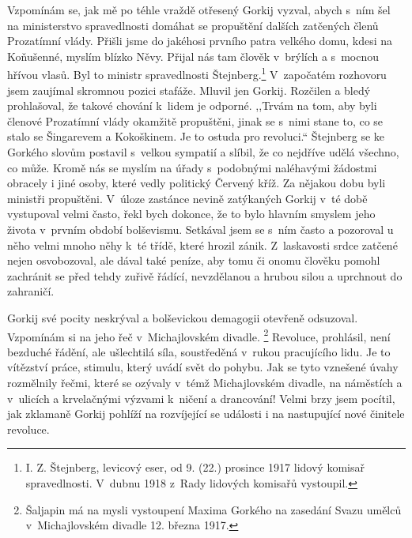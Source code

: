 Vzpomínám se, jak mě po téhle vraždě otřesený Gorkij vyzval, abych s ním šel na ministerstvo spravedlnosti domáhat se propuštění dalších zatčených členů Prozatímní vlády. Přišli jsme do jakéhosi prvního patra velkého domu, kdesi na Koňušenné, myslím blízko Něvy. Přijal nás tam člověk v brýlích a s mocnou hřívou vlasů. Byl to ministr spravedlnosti Štejnberg.\footnote{I. Z. Štejnberg, levicový eser, od 9. (22.) prosince 1917 lidový komisař spravedlnosti. V dubnu 1918 z Rady lidových komisařů vystoupil.} V započatém rozhovoru jsem zaujímal skromnou pozici stafáže. Mluvil jen Gorkij. Rozčilen a bledý prohlašoval, že takové chování k lidem je odporné. ,,Trvám na tom, aby byli členové Prozatímní vlády okamžitě propuštěni, jinak se s nimi stane to, co se stalo se Šingarevem a Kokoškinem. Je to ostuda pro revoluci.`` Štejnberg se ke Gorkého slovům postavil s velkou sympatií a slíbil, že co nejdříve udělá všechno, co může. Kromě nás se myslím na úřady s podobnými naléhavými žádostmi obracely i jiné osoby, které vedly politický Červený kříž. Za nějakou dobu byli ministři propuštěni. V úloze zastánce nevině zatýkaných Gorkij v té době vystupoval velmi často, řekl bych dokonce, že to bylo hlavním smyslem jeho života v prvním období bolševismu. Setkával jsem se s ním často a pozoroval u něho velmi mnoho něhy k té třídě, které hrozil zánik. Z laskavosti srdce zatčené nejen osvobozoval, ale dával také peníze, aby tomu či onomu člověku pomohl zachránit se před tehdy zuřivě řádící, nevzdělanou a hrubou silou a uprchnout do zahraničí.    

Gorkij své pocity neskrýval a bolševickou demagogii otevřeně odsuzoval. Vzpomínám si na jeho řeč v Michajlovském divadle. \footnote{Šaljapin má na mysli vystoupení Maxima Gorkého na zasedání Svazu umělců v Michajlovském divadle 12. března 1917.} Revoluce, prohlásil, není bezduché řádění, ale ušlechtilá síla, soustředěná v rukou pracujícího lidu. Je to vítězství práce, stimulu, který uvádí svět do pohybu. Jak se tyto vznešené úvahy rozmělnily řečmi, které se ozývaly v témž Michajlovském divadle, na náměstích a v ulicích a krvelačnými výzvami k ničení a drancování! Velmi brzy jsem pocítil, jak zklamaně Gorkij pohlíží na rozvíjející se události i na nastupující nové činitele revoluce. 

